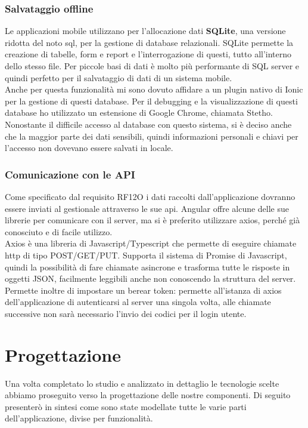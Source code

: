 \subsubsection{Salvataggio offline}
Le applicazioni mobile utilizzano per l'allocazione dati \textbf{SQLite}, una versione ridotta del noto \acrshort{sql}, per la gestione di
\gls{database} relazionali. SQLite permette la creazione di tabelle, form e report e l'interrogazione di questi, tutto all'interno dello
stesso file. Per piccole basi di dati è molto più performante di SQL server e quindi perfetto per il salvataggio di dati di un sistema
mobile. \\
\noindent Anche per questa funzionalità mi sono dovuto affidare a un plugin nativo di Ionic per la gestione di questi database. Per il
debugging e la visualizzazione di questi database ho utilizzato un estensione di Google Chrome, chiamata Stetho.\\
\noindent Nonostante il difficile accesso al database con questo sistema, si è deciso anche che la maggior parte dei dati sensibili, quindi
informazioni personali e chiavi per l'accesso non dovevano essere salvati in locale. 

\subsubsection{Comunicazione con le API}
Come specificato dal requisito RF12O i dati raccolti dall'applicazione dovranno essere inviati al gestionale attraverso
le sue \acrshort{api}. Angular offre alcune delle sue librerie per comunicare con il server, ma si è preferito utilizzare
axios, perché già conosciuto e di facile utilizzo. \\
Axios è una libreria di Javascript/Typescript che permette di eseguire chiamate \acrshort{http} di tipo POST/GET/PUT.
Supporta il sistema di Promise di Javascript, quindi la possibilità di fare chiamate asincrone e trasforma tutte le
risposte in oggetti JSON, facilmente leggibili anche non conoscendo la struttura del server. Permette inoltre di
impostare un berear token: permette all'istanza di axios dell'applicazione di autenticarsi al server una singola
volta, alle chiamate successive non sarà necessario l'invio dei codici per il login utente.

\section{Progettazione}
Una volta completato lo studio e analizzato in dettaglio le tecnologie scelte abbiamo proseguito verso la progettazione
delle nostre componenti. Di seguito presenterò in sintesi come sono state modellate tutte le varie parti
dell'applicazione, divise per funzionalità.
